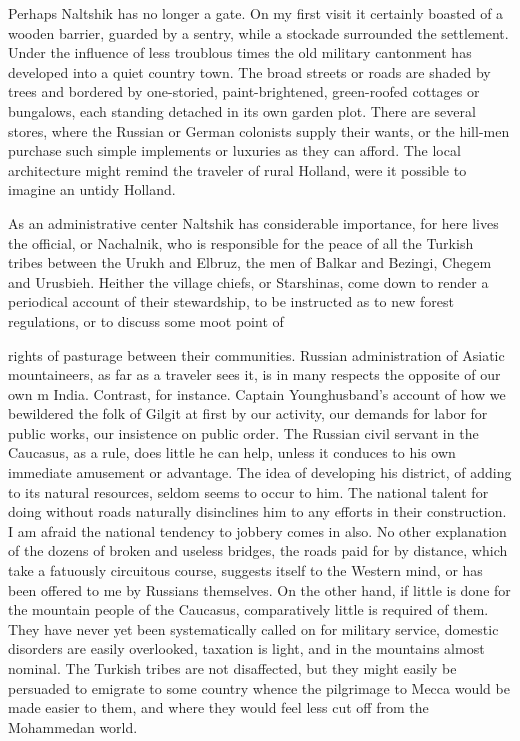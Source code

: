 \documentclass[25pt, a4paper]{article}
\begin{document}
	Perhaps Naltshik has no longer a gate. On my first visit it certainly boasted of a wooden barrier, guarded by a sentry, while a stockade surrounded the settlement. Under the influence of less troublous times the old military cantonment has developed into a quiet country town. The broad streets or roads are shaded by trees and bordered by one-storied, paint-brightened, green-roofed cottages or bungalows, each standing detached in its own garden plot. There are several stores, where the Russian or German colonists supply their wants, or the hill-men purchase such simple implements or luxuries as they can afford. The local architecture might remind the traveler of rural Holland, were it possible to imagine an untidy Holland.
	
	As an administrative center Naltshik has considerable importance, for here lives the official, or Nachalnik, who is responsible for the peace of all the Turkish tribes between the Urukh and Elbruz, the men of Balkar and Bezingi, Chegem and Urusbieh. Heither the village chiefs, or Starshinas, come down to render a periodical account of their stewardship, to be instructed as to new forest regulations, or to discuss some moot point of
	
	rights of pasturage between their communities. Russian administration of Asiatic mountaineers, as far as a traveler sees it, is in many respects the opposite of our own m India. Contrast, for instance. Captain Younghusband's account of how we bewildered the folk of Gilgit at first by our activity, our demands for labor for public works, our insistence on public order. The Russian civil servant in the Caucasus, as a rule, does little he can help, unless it conduces to his own immediate amusement or advantage. The idea of developing his district, of adding to its natural resources, seldom seems to occur to him. The national talent for doing without roads naturally disinclines him to any efforts in their construction. I am afraid the national tendency to jobbery comes in also. No other explanation of the dozens of broken and useless bridges, the roads paid for by distance, which take a fatuously circuitous course, suggests itself to the Western mind, or has been offered to me by Russians themselves. On the other hand, if little is done for the mountain people of the Caucasus, comparatively little is required of them. They have never yet been systematically called on for military service, domestic disorders are easily overlooked, taxation is light, and in the mountains almost nominal. The Turkish tribes are not disaffected, but they might easily be persuaded to emigrate to some country whence the pilgrimage to Mecca would be made easier to them, and where they would feel less cut off from the Mohammedan world.
	
\end{document}
